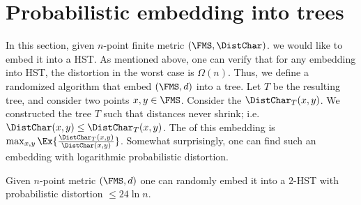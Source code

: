 
\section{Probabilistic embedding into trees}

In this section, given $n$-point finite metric $(\FMS,\DistChar)$. we
would like to embed it into a HST. As mentioned above, one can verify
that for any embedding into HST, the distortion in the worst case is
$\Omega(n)$.  Thus, we define a randomized algorithm that embed
$(\FMS,d)$ into a tree. Let $T$ be the resulting tree, and consider
two points $x,y \in \FMS$. Consider the 
$\DistChar_T(x,y)$. We constructed the tree $T$ such that distances never
shrink; i.e.  $\DistChar(x,y) \leq \DistChar_T(x,y)$. The  of this embedding is $\max_{x,y}
\Ex{\frac{\DistChar_T(x,y)}{\DistChar(x,y)}}$.  Somewhat surprisingly, one can
find such an embedding with logarithmic probabilistic distortion.




\begin{theorem}
    Given $n$-point metric $(\FMS,d)$ one can randomly embed it into a
    $2$-HST  with probabilistic distortion $\leq 24 \ln n$.

\end{theorem}

